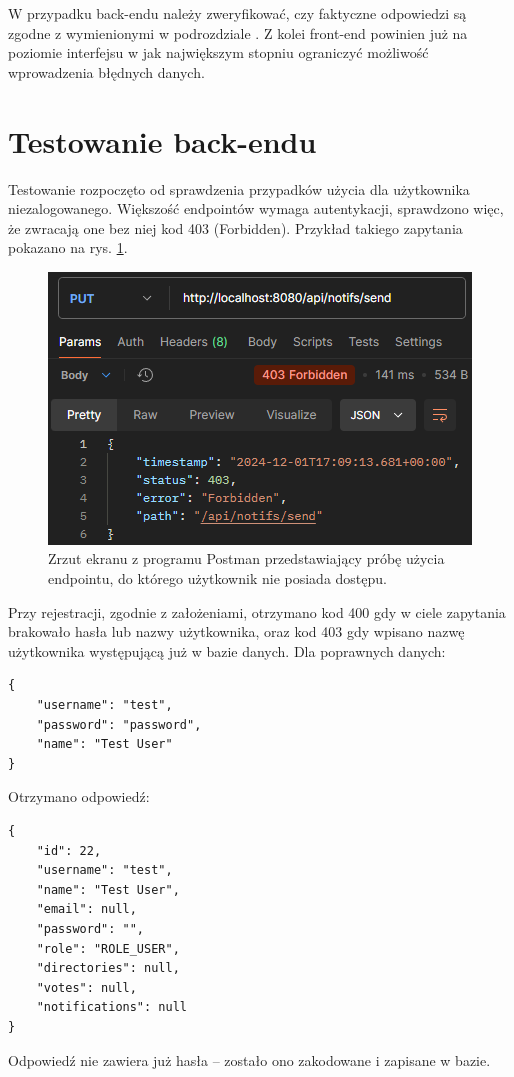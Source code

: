 \documentclass[a4paper,twoside,12pt]{book}
\begin{document}
W przypadku back-endu należy zweryfikować, czy faktyczne odpowiedzi są zgodne z wymienionymi w podrozdziale . Z kolei front-end powinien już na poziomie interfejsu w jak największym stopniu ograniczyć możliwość wprowadzenia błędnych danych.

\section{Testowanie back-endu}

Testowanie rozpoczęto od sprawdzenia przypadków użycia dla użytkownika niezalogowanego. Większość endpointów wymaga autentykacji, sprawdzono więc, że zwracają one bez niej kod 403 (Forbidden). Przykład takiego zapytania pokazano na rys. \ref{fig:send-notifs-403}.

\begin{figure}
\centering
\includegraphics[width=\textwidth]{./SendNotifs403.png}
\caption{Zrzut ekranu z programu Postman przedstawiający próbę użycia endpointu, do którego użytkownik nie posiada dostępu.}
\label{fig:send-notifs-403}
\end{figure}

Przy rejestracji, zgodnie z założeniami, otrzymano kod 400 gdy w ciele zapytania brakowało hasła lub nazwy użytkownika, oraz kod 403 gdy wpisano nazwę użytkownika występującą już w bazie danych. Dla poprawnych danych:
\begin{verbatim}
{
	"username": "test",
	"password": "password",
	"name": "Test User"
}
\end{verbatim}
Otrzymano odpowiedź:
\begin{verbatim}
{
	"id": 22,
	"username": "test",
	"name": "Test User",
	"email": null,
	"password": "",
	"role": "ROLE_USER",
	"directories": null,
	"votes": null,
	"notifications": null
}
\end{verbatim}
Odpowiedź nie zawiera już hasła -- zostało ono zakodowane i zapisane w bazie.
\end{document}
